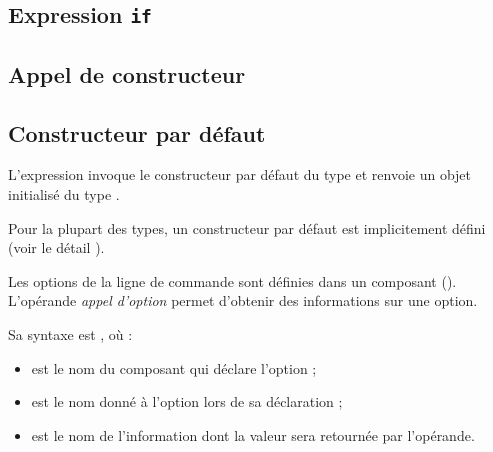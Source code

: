 \subsection{Expression \texttt{if}}




\subsection{Appel de constructeur}



\subsection{Constructeur par défaut}

L'expression \galgas{[@T default]} invoque le constructeur par défaut du type  et renvoie un objet initialisé du type .

Pour la plupart des types, un constructeur par défaut est implicitement défini (voir le détail ).





Les options de la ligne de commande sont définies dans un composant  (). L'opérande \emph{appel d'option} permet d'obtenir des informations sur une option.

Sa syntaxe est , où :
\begin{itemize}
  \item {} est le nom du composant  qui déclare l'option ;
  \item {} est le nom donné à l'option lors de sa déclaration ;
  \item {} est le nom de l'information dont la valeur sera retournée par l'opérande.
\end{itemize}


